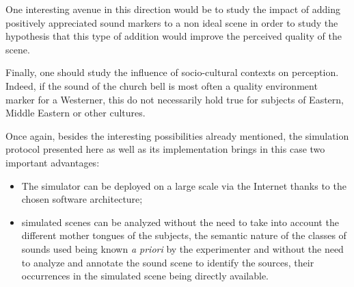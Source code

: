 \documentclass[twoside,twocolumn]{article}
\begin{document}
One interesting avenue in this direction would be to study the impact of adding positively appreciated sound markers to a non ideal scene in order to study the hypothesis that this type of addition would improve the perceived quality of the scene.


Finally, one should study the influence of socio-cultural contexts on perception. Indeed, if the sound of the church bell is most often a quality environment marker for a Westerner, this do not necessarily hold true for subjects of Eastern, Middle Eastern or other cultures.


Once again, besides the interesting possibilities already mentioned, the simulation protocol presented here as well as its implementation brings in this case two important advantages:


\begin{itemize}
\item The simulator can be deployed on a large scale via the Internet thanks to the chosen software architecture;
\item simulated scenes can be analyzed without the need to take into account the different mother tongues of the subjects, the semantic nature of the classes of sounds used being known \emph{a priori} by the experimenter and without the need to analyze and annotate the sound scene to identify the sources, their occurrences in the simulated scene being directly available.
\end{itemize}
\end{document}
